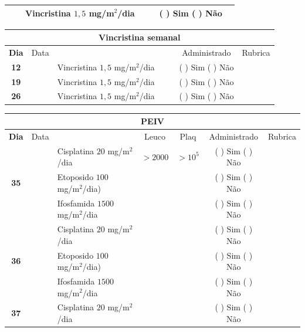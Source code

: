 \documentclass[11pt,a4paper,oldfontcommands]{memoir}
\begin{document}
\begin{center}
\begin{longtable}{p{1cm}c|p{4cm}|p{2cm}p{2cm}|c|c}
    \multicolumn{1}{c|}{}&&{Vincristina \(1,5\) mg/m\(^2\)/dia}&&&{(  ) Sim (  ) Não}&\\
    \hline
\end{longtable}
\begin{longtable}{p{1cm}c|p{4cm}|p{2cm}p{2cm}|c|c}
	\hline
	\multicolumn{7}{c}{Vincristina semanal} \\
	\hline
	\multicolumn{1}{c|}{\multirow{1}{*}{\textbf{Dia}}}&{Data}&{}&{}&&{Administrado}&{Rubrica} \\
    \hline
    \multicolumn{1}{c|}{\textbf{12}}&&{Vincristina \(1,5\) mg/m\(^2\)/dia}&\multicolumn{1}{c}{}&&{(  ) Sim (  ) Não}&\\
    \cline{1-3}\cline{6-6}
    \multicolumn{1}{c|}{\textbf{19}}&&{Vincristina \(1,5\) mg/m\(^2\)/dia}&\multicolumn{1}{c}{}&&{(  ) Sim (  ) Não}&\\
    \cline{1-3}\cline{6-6}
    \multicolumn{1}{c|}{\textbf{26}}&&{Vincristina \(1,5\) mg/m\(^2\)/dia}&\multicolumn{1}{c}{}&&{(  ) Sim (  ) Não}&\\
    \hline
\end{longtable}
\begin{longtable}{p{1cm}c|p{4cm}|p{2cm}p{2cm}|c|c}
	\hline
	\multicolumn{7}{c}{PEIV} \\
	\hline
	\multicolumn{1}{c|}{\multirow{1}{*}{\textbf{Dia}}}&{Data}&{}&\multicolumn{1}{c|}{Leuco}&\multicolumn{1}{c|}{Plaq}&{Administrado}&{Rubrica} \\
    \hline
    \multicolumn{1}{c|}{\multirow{3}{*}{\textbf{35}}}&\multirow{3}{*}{}&{Cisplatina \(20\) mg/m\(^2\)/dia}&\multicolumn{1}{c|}{\(>2000\)}&\multicolumn{1}{c|}{\(>10^5\)}&{(  ) Sim (  ) Não}&\\
    \cline{4-5}
    \multicolumn{1}{c|}{}&&{Etoposido \(100\) mg/m\(^2\)/dia)}&\multicolumn{1}{c|}{}&&{(  ) Sim (  ) Não}&\\
    \multicolumn{1}{c|}{}&&{Ifosfamida \(1500\) mg/m\(^2\)/dia}&\multicolumn{1}{c|}{}&&{(  ) Sim (  ) Não}&\\
    \cline{2-6}
    \multicolumn{1}{c|}{\multirow{3}{*}{\textbf{36}}}&\multirow{3}{*}{}&{Cisplatina \(20\) mg/m\(^2\)/dia}&{}&&{(  ) Sim (  ) Não}&\\
    \multicolumn{1}{c|}{}&&{Etoposido \(100\) mg/m\(^2\)/dia)}&&&{(  ) Sim (  ) Não}&\\
    \multicolumn{1}{c|}{}&&{Ifosfamida \(1500\) mg/m\(^2\)/dia}&&&{(  ) Sim (  ) Não}&\\
    \cline{2-3}\cline{6-6}
    \multicolumn{1}{c|}{\multirow{3}{*}{\textbf{37}}}&\multirow{3}{*}{}&{Cisplatina \(20\) mg/m\(^2\)/dia}&{}&&{(  ) Sim (  ) Não}&\\

\end{longtable}
\end{center}
\end{document}
